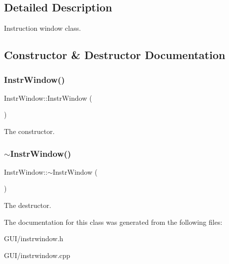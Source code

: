 \subsection{Detailed Description}
Instruction window class. 

\subsection{Constructor \& Destructor Documentation}
\mbox{\label{classInstrWindow_a4d425c2334a77bdc9e3f0aa91e691909}} 
\subsubsection{\texorpdfstring{Instr\+Window()}{InstrWindow()}}
{\footnotesize\ttfamily Instr\+Window\+::\+Instr\+Window (\begin{DoxyParamCaption}{ }\end{DoxyParamCaption})}

The constructor. \mbox{\label{classInstrWindow_a192ae02056142b9567d9c87c0708f7a5}} 
\subsubsection{\texorpdfstring{$\sim$\+Instr\+Window()}{~InstrWindow()}}
{\footnotesize\ttfamily Instr\+Window\+::$\sim$\+Instr\+Window (\begin{DoxyParamCaption}{ }\end{DoxyParamCaption})}

The destructor. 

The documentation for this class was generated from the following files\+:\begin{DoxyCompactItemize}
\item 
G\+U\+I/instrwindow.\+h\item 
G\+U\+I/instrwindow.\+cpp\end{DoxyCompactItemize}
